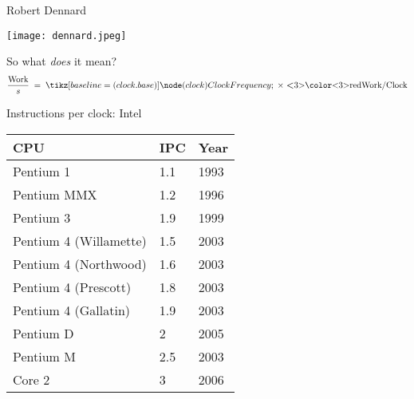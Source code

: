 \documentclass[english,compress]{beamer}
\begin{document}
\begin{frame}{Robert Dennard}
  \begin{center}
    \texttt{[image: dennard.jpeg]}
  \end{center}
\end{frame}
\begin{frame}{So what \emph{does} it mean?}
  \[
    \frac{\text{Work}}s\; = \;\tikz [baseline=(clock.base)] \node (clock) {Clock Frequency} ; \; \times \; \text{\textbf<3>{\color<3>{red}Work/Clock}}
  \]
\end{frame}
\begin{frame}{Instructions per clock: Intel}
  \begin{center}
    \begin{tabular}{l|l|l}
      CPU & IPC & Year\\
      \hline
      Pentium 1    &  1.1 & 1993\\
      Pentium MMX  &  1.2 & 1996 \\
      Pentium 3    &   1.9 & 1999 \\
      Pentium 4 (Willamette)&1.5 & 2003\\
      Pentium 4 (Northwood)&1.6 & 2003\\
      Pentium 4 (Prescott)&1.8 & 2003\\
      Pentium 4 (Gallatin)&1.9 & 2003\\
      Pentium D      &2 & 2005 \\
      Pentium M      &2.5 & 2003 \\
      Core 2         &3 & 2006 \\
    \end{tabular}
  \end{center}
\end{frame}
\end{document}
